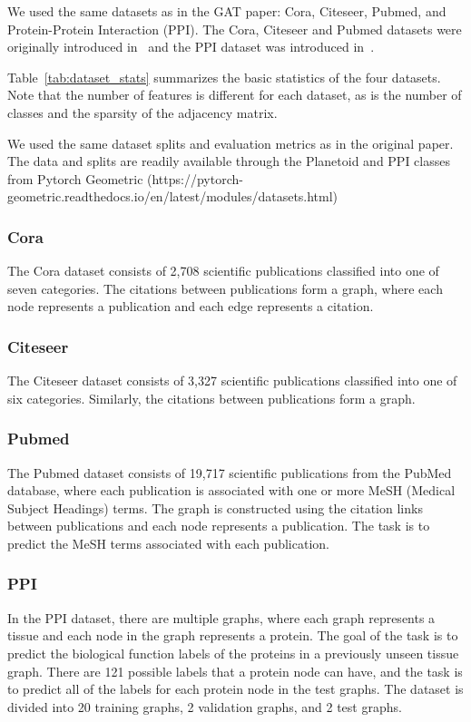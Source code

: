 We used the same datasets as in the GAT paper: Cora, Citeseer, Pubmed, and
Protein-Protein Interaction (PPI).  The Cora, Citeseer and Pubmed datasets were
originally introduced in~\cite{sen2008collective} and the PPI dataset was
introduced in~\cite{hamilton2017inductive}.

Table~\ref{tab:dataset_stats} summarizes the basic statistics of the four
datasets.  Note that the number of features is different for each dataset, as
is the number of classes and the sparsity of the adjacency matrix.

We used the same dataset splits and evaluation metrics as in the original
paper. The data and splits are readily available through the Planetoid and PPI
classes from Pytorch Geometric
(https://pytorch-geometric.readthedocs.io/en/latest/modules/datasets.html)

\subsubsection{Cora}
The Cora dataset consists of 2,708 scientific publications classified into one
of seven categories.  The citations between publications form a graph, where
each node represents a publication and each edge represents a citation.

\subsubsection{Citeseer}
The Citeseer dataset consists of 3,327 scientific publications classified into
one of six categories.  Similarly, the citations between publications form a
graph.

\subsubsection{Pubmed}
The Pubmed dataset consists of 19,717 scientific publications from the PubMed
database, where each publication is associated with one or more MeSH (Medical
Subject Headings) terms.  The graph is constructed using the citation links
between publications and each node represents a publication.  The task is to
predict the MeSH terms associated with each publication.

\subsubsection{PPI}
In the PPI dataset, there are multiple graphs, where each graph represents a
tissue and each node in the graph represents a protein.  The goal of the task
is to predict the biological function labels of the proteins in a previously
unseen tissue graph.  There are 121 possible labels that a protein node can
have, and the task is to predict all of the labels for each protein node in the
test graphs.  The dataset is divided into 20 training graphs, 2 validation
graphs, and 2 test graphs.

